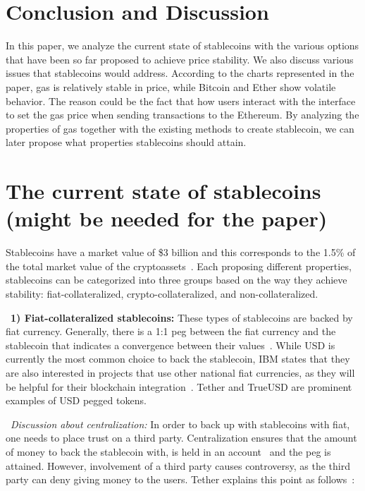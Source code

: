 \section{Conclusion and Discussion}
In this paper, we analyze the current state of stablecoins with the various options that have been so far proposed to achieve price stability. We also discuss various issues that stablecoins would address. According to the charts represented in the paper, gas is relatively stable in price, while Bitcoin and Ether show volatile behavior. The reason could be the fact that how users interact with the interface to set the gas price when sending transactions to the Ethereum. By analyzing the properties of gas together with the existing methods to create stablecoin, we can later propose what properties stablecoins should attain.

\section{The current state of stablecoins (might be needed for the paper)}

Stablecoins have a market value of \$3 billion and this corresponds to the 1.5\% of the total market value of the cryptoassets~\cite{report}. Each proposing different properties, stablecoins can be categorized into three groups based on the way they achieve stability: fiat-collateralized, crypto-collateralized, and non-collateralized.

~\textbf{1) Fiat-collateralized stablecoins:} These types of stablecoins are backed by fiat currency. Generally, there is a 1:1 peg between the fiat currency and the stablecoin that indicates a convergence between their values~\cite{linkedin}. While USD is currently the most common choice to back the stablecoin, IBM states that they are also interested in projects that use other national fiat currencies, as they will be helpful for their blockchain integration~\cite{cointelegraph}. Tether and TrueUSD are prominent examples of USD pegged tokens.

~\textit{Discussion about centralization:} In order to back up with stablecoins with fiat, one needs to place trust on a third party. Centralization ensures that the amount of money to back the stablecoin with, is held in an account~\cite{techrev} and the peg is attained. However, involvement of a third party causes controversy, as the third party can deny giving money to the users. Tether explains this point as follows~\cite{cryptoinsider}:

